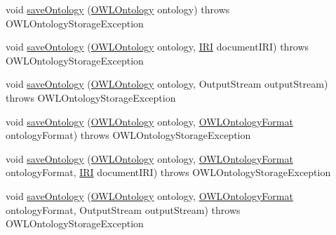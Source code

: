 \begin{DoxyCompactItemize}
\item 
void \hyperlink{interfaceorg_1_1semanticweb_1_1owlapi_1_1model_1_1_o_w_l_ontology_manager_ae4f59a2e6662e074356ec3d080e8598f}{save\-Ontology} (\hyperlink{interfaceorg_1_1semanticweb_1_1owlapi_1_1model_1_1_o_w_l_ontology}{O\-W\-L\-Ontology} ontology)  throws O\-W\-L\-Ontology\-Storage\-Exception
\item 
void \hyperlink{interfaceorg_1_1semanticweb_1_1owlapi_1_1model_1_1_o_w_l_ontology_manager_a3f3c2fa66b342ffe62a40f088bd79ad4}{save\-Ontology} (\hyperlink{interfaceorg_1_1semanticweb_1_1owlapi_1_1model_1_1_o_w_l_ontology}{O\-W\-L\-Ontology} ontology, \hyperlink{classorg_1_1semanticweb_1_1owlapi_1_1model_1_1_i_r_i}{I\-R\-I} document\-I\-R\-I)  throws O\-W\-L\-Ontology\-Storage\-Exception
\item 
void \hyperlink{interfaceorg_1_1semanticweb_1_1owlapi_1_1model_1_1_o_w_l_ontology_manager_a8094a1068233681217f3295e26fca179}{save\-Ontology} (\hyperlink{interfaceorg_1_1semanticweb_1_1owlapi_1_1model_1_1_o_w_l_ontology}{O\-W\-L\-Ontology} ontology, Output\-Stream output\-Stream)  throws O\-W\-L\-Ontology\-Storage\-Exception
\item 
void \hyperlink{interfaceorg_1_1semanticweb_1_1owlapi_1_1model_1_1_o_w_l_ontology_manager_a0b157199f0de8613be18c8fbf8e53a3c}{save\-Ontology} (\hyperlink{interfaceorg_1_1semanticweb_1_1owlapi_1_1model_1_1_o_w_l_ontology}{O\-W\-L\-Ontology} ontology, \hyperlink{classorg_1_1semanticweb_1_1owlapi_1_1model_1_1_o_w_l_ontology_format}{O\-W\-L\-Ontology\-Format} ontology\-Format)  throws O\-W\-L\-Ontology\-Storage\-Exception
\item 
void \hyperlink{interfaceorg_1_1semanticweb_1_1owlapi_1_1model_1_1_o_w_l_ontology_manager_a9f8861f54b43253a2cf6d838eb0cae89}{save\-Ontology} (\hyperlink{interfaceorg_1_1semanticweb_1_1owlapi_1_1model_1_1_o_w_l_ontology}{O\-W\-L\-Ontology} ontology, \hyperlink{classorg_1_1semanticweb_1_1owlapi_1_1model_1_1_o_w_l_ontology_format}{O\-W\-L\-Ontology\-Format} ontology\-Format, \hyperlink{classorg_1_1semanticweb_1_1owlapi_1_1model_1_1_i_r_i}{I\-R\-I} document\-I\-R\-I)  throws O\-W\-L\-Ontology\-Storage\-Exception
\item 
void \hyperlink{interfaceorg_1_1semanticweb_1_1owlapi_1_1model_1_1_o_w_l_ontology_manager_ae79320a4fd2d8f2260e7f485a247679b}{save\-Ontology} (\hyperlink{interfaceorg_1_1semanticweb_1_1owlapi_1_1model_1_1_o_w_l_ontology}{O\-W\-L\-Ontology} ontology, \hyperlink{classorg_1_1semanticweb_1_1owlapi_1_1model_1_1_o_w_l_ontology_format}{O\-W\-L\-Ontology\-Format} ontology\-Format, Output\-Stream output\-Stream)  throws O\-W\-L\-Ontology\-Storage\-Exception

\end{DoxyCompactItemize}
